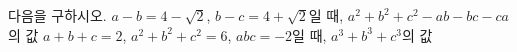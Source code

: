 다음을 구하시오.
 $a-b=4-\sqrt{2}$, $b-c=4+\sqrt{2}$일 때, $a^2+b^2+c^2-ab-bc-ca$의 값
 $a+b+c=2$, $a^2+b^2+c^2=6$, $abc=-2$일 때, $a^3+b^3+c^3$의 값

